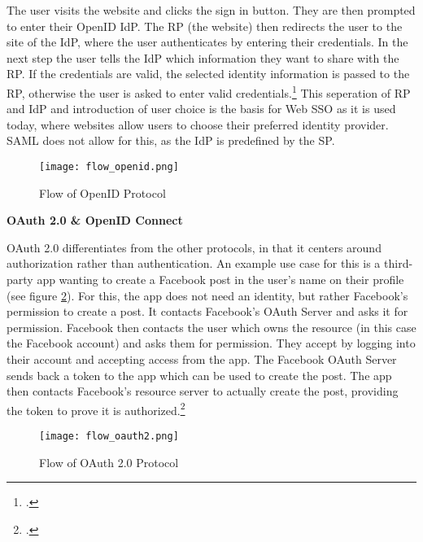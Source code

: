 The user visits the website and clicks the sign in button. They are then prompted to enter their OpenID \ac{IdP}.
The \ac{RP} (the website) then redirects the user to the site of the \ac{IdP}, where the user authenticates by
entering their credentials. In the next step the user tells the \ac{IdP} which information they want to share with
the \ac{RP}. If the credentials are valid, the selected identity information is passed to the \ac{RP}, otherwise
the user is asked to enter valid credentials.\footcite[Cp.][p. 21]{Bazaz2016}
This seperation of \ac{RP} and \ac{IdP} and introduction of user choice is the basis for Web \ac{SSO} as it is used today,
where websites allow users to choose their preferred identity provider.
\ac{SAML} does not allow for this, as the \ac{IdP} is predefined by the \ac{SP}.

\begin{figure}[H]
    \centering
    \caption{Flow of OpenID Protocol}
	\label{fig:flow_openid}
    \texttt{[image: flow\_openid.png]}
    \\
    \cite[Source:][p. 22]{Bazaz2016}
\end{figure}

\textbf{OAuth 2.0 \& OpenID Connect}

OAuth 2.0 differentiates from the other protocols, in that it centers around authorization rather than authentication.
An example use case for this is a third-party app wanting to create a Facebook post in the user's name on their profile (see figure \ref{fig:flow_oauth2}).
For this, the app does not need an identity, but rather Facebook's permission to create a post.
It contacts Facebook's OAuth Server and asks it for permission. Facebook then contacts the user which owns the resource
(in this case the Facebook account) and asks them for permission. They accept by logging into their account and accepting
access from the app. The Facebook OAuth Server sends back a token to the app which can be used to create the post.
The app then contacts Facebook's resource server to actually create the post, providing the token to prove it is authorized.\footcite[Cp.][]{Wesener2021}

\begin{figure}[H]
    \centering
    \caption{Flow of OAuth 2.0 Protocol}
	\label{fig:flow_oauth2}
    \texttt{[image: flow\_oauth2.png]}
    \\
    \cite[Source:][p. 22]{Wesener2021}
\end{figure}

